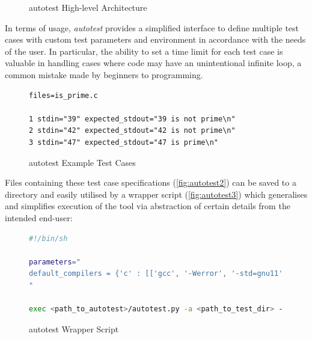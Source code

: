 \documentclass[hidelinks]{report}
\begin{document}
\begin{figure}[h]
	\centering
	\caption{autotest High-level Architecture}
	\label{fig:autotest1}
\end{figure}

In terms of usage, \textit{autotest} provides a simplified interface to define multiple test cases with custom test parameters and environment in accordance with the needs of the user. In particular, the ability to set a time limit for each test case is valuable in handling cases where code may have an unintentional infinite loop, a common mistake made by beginners to programming.

\begin{figure}[h]
	\centering
	\begin{lstlisting}[linewidth=\linewidth]
files=is_prime.c
		
1 stdin="39" expected_stdout="39 is not prime\n"
2 stdin="42" expected_stdout="42 is not prime\n"
3 stdin="47" expected_stdout="47 is prime\n"
	\end{lstlisting}
	\caption{autotest Example Test Cases}
	\label{fig:autotest2}
\end{figure}

Files containing these test case specifications (\autoref{fig:autotest2}) can be saved to a directory and easily utilised by a wrapper script (\autoref{fig:autotest3}) which generalises and simplifies execution of the tool via abstraction of certain details from the intended end-user:

\begin{figure}[h]
	\centering
	\begin{lstlisting}[language=bash, breaklines=true, linewidth=\linewidth]
#!/bin/sh

parameters="
default_compilers = {'c' : [['gcc', '-Werror', '-std=gnu11', '-g', '-lm']]}
"

exec <path_to_autotest>/autotest.py -a <path_to_test_dir> --parameters "$parameters" "$@"
	\end{lstlisting}
	\caption{autotest Wrapper Script}
	\label{fig:autotest3}
\end{figure}
\end{document}
